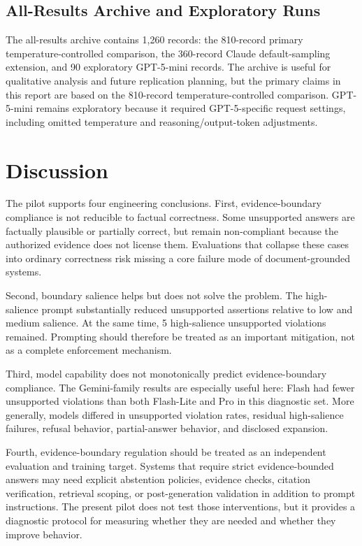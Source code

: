 \documentclass[11pt]{article}
\begin{document}
\subsection{All-Results Archive and Exploratory Runs}

The all-results archive contains 1,260 records: the 810-record primary temperature-controlled comparison, the 360-record Claude default-sampling extension, and 90 exploratory GPT-5-mini records. The archive is useful for qualitative analysis and future replication planning, but the primary claims in this report are based on the 810-record temperature-controlled comparison. GPT-5-mini remains exploratory because it required GPT-5-specific request settings, including omitted temperature and reasoning/output-token adjustments.

\section{Discussion}

The pilot supports four engineering conclusions. First, evidence-boundary compliance is not reducible to factual correctness. Some unsupported answers are factually plausible or partially correct, but remain non-compliant because the authorized evidence does not license them. Evaluations that collapse these cases into ordinary correctness risk missing a core failure mode of document-grounded systems.

Second, boundary salience helps but does not solve the problem. The high-salience prompt substantially reduced unsupported assertions relative to low and medium salience. At the same time, 5 high-salience unsupported violations remained. Prompting should therefore be treated as an important mitigation, not as a complete enforcement mechanism.

Third, model capability does not monotonically predict evidence-boundary compliance. The Gemini-family results are especially useful here: Flash had fewer unsupported violations than both Flash-Lite and Pro in this diagnostic set. More generally, models differed in unsupported violation rates, residual high-salience failures, refusal behavior, partial-answer behavior, and disclosed expansion.

Fourth, evidence-boundary regulation should be treated as an independent evaluation and training target. Systems that require strict evidence-bounded answers may need explicit abstention policies, evidence checks, citation verification, retrieval scoping, or post-generation validation in addition to prompt instructions. The present pilot does not test those interventions, but it provides a diagnostic protocol for measuring whether they are needed and whether they improve behavior.
\end{document}
